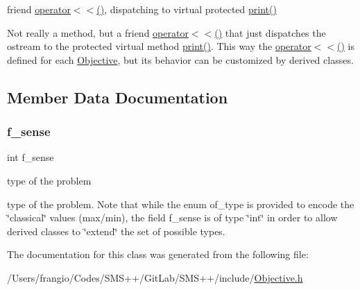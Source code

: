 friend \mbox{\hyperlink{class_s_m_spp__di__unipi__it_1_1_objective_a204a6bc05702d546cc2f487ce03ddac9}{operator$<$$<$()}}, dispatching to virtual protected \mbox{\hyperlink{class_s_m_spp__di__unipi__it_1_1_objective_a2e7b9c9148a98c5c342e8c25cac95926}{print()}} 

Not really a method, but a friend \mbox{\hyperlink{class_s_m_spp__di__unipi__it_1_1_objective_a204a6bc05702d546cc2f487ce03ddac9}{operator$<$$<$()}} that just dispatches the ostream to the protected virtual method \mbox{\hyperlink{class_s_m_spp__di__unipi__it_1_1_objective_a2e7b9c9148a98c5c342e8c25cac95926}{print()}}. This way the \mbox{\hyperlink{class_s_m_spp__di__unipi__it_1_1_objective_a204a6bc05702d546cc2f487ce03ddac9}{operator$<$$<$()}} is defined for each \mbox{\hyperlink{class_s_m_spp__di__unipi__it_1_1_objective}{Objective}}, but its behavior can be customized by derived classes. 

\subsection{Member Data Documentation}
\mbox{\label{class_s_m_spp__di__unipi__it_1_1_objective_afd682bff68e0e4bc7e2d8e9607b3847d}} 
\subsubsection{\texorpdfstring{f\+\_\+sense}{f\_sense}}
{\footnotesize\ttfamily int f\+\_\+sense\hspace{0.3cm}{\ttfamily [protected]}}



type of the problem 

type of the problem. Note that while the enum of\+\_\+type is provided to encode the \char`\"{}classical\char`\"{} values (max/min), the field f\+\_\+sense is of type \char`\"{}int\char`\"{} in order to allow derived classes to \char`\"{}extend\char`\"{} the set of possible types. 

The documentation for this class was generated from the following file\+:\begin{DoxyCompactItemize}
\item 
/\+Users/frangio/\+Codes/\+S\+M\+S++/\+Git\+Lab/\+S\+M\+S++/include/\mbox{\hyperlink{_objective_8h}{Objective.\+h}}\end{DoxyCompactItemize}
